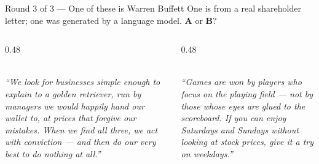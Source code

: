 \begin{frame}{Round 3 of 3 --- One of these is Warren Buffett}
  {\small One is from a real shareholder letter; one was generated by a language model. \textbf{A} or \textbf{B}?}\par
  \vspace{2mm}
  \begin{columns}[T,onlytextwidth]
    \begin{column}{0.48\textwidth}
      \begin{tcolorbox}[enhanced, colback=black!3, boxrule=0pt, leftrule=2.5pt, colframe=black!40, arc=2pt,
                        left=2mm, right=2mm, top=1.5mm, bottom=1.5mm, equal height group=r3]
        \\[1mm]
        \small\itshape ``We look for businesses simple enough to explain to a golden retriever,
        run by managers we would happily hand our wallet to, at prices that forgive our mistakes.
        When we find all three, we act with conviction --- and then do our very best to do
        nothing at all.''
      \end{tcolorbox}
    \end{column}
    \begin{column}{0.48\textwidth}
      \begin{tcolorbox}[enhanced, colback=black!3, boxrule=0pt, leftrule=2.5pt, colframe=black!40, arc=2pt,
                        left=2mm, right=2mm, top=1.5mm, bottom=1.5mm, equal height group=r3]
        \\[1mm]
        \small\itshape ``Games are won by players who focus on the playing field --- not by those
        whose eyes are glued to the scoreboard. If you can enjoy Saturdays and Sundays without
        looking at stock prices, give it a try on weekdays.''
      \end{tcolorbox}
    \end{column}
  \end{columns}
\end{frame}

